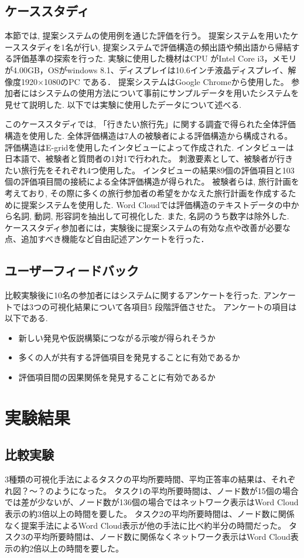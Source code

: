 \documentclass[syuuron]{kuee}
\begin{document}
	\section{ケーススタディ}
		本節では, 提案システムの使用例を通じた評価を行う。
		提案システムを用いたケーススタディを1名が行い, 提案システムで評価構造の頻出語や頻出語から帰結する評価基準の探索を行った. 
		実験に使用した機材はCPU がIntel Core i3，メモリが4.00GB，OSがwindows 8.1、ディスプレイは10.6インチ液晶ディスプレイ、解像度1920×1080のPC である．
		提案システムはGoogle Chromeから使用した。
		参加者にはシステムの使用方法について事前にサンプルデータを用いたシステムを見せて説明した. 以下では実験に使用したデータについて述べる. 
		
		このケーススタディでは, 「行きたい旅行先」に関する調査で得られた全体評価構造を使用した. 
		全体評価構造は7人の被験者による評価構造から構成される。
		評価構造はE-gridを使用したインタビューによって作成された. 
		インタビューは日本語で、被験者と質問者の1対1で行われた。
		刺激要素として、被験者が行きたい旅行先をそれぞれ4つ使用した。
		インタビューの結果89個の評価項目と103個の評価項目間の接続による全体評価構造が得られた。
		被験者らは, 旅行計画を考えており, その際に多くの旅行参加者の希望をかなえた旅行計画を作成するために提案システムを使用した. 
		Word Cloudでは評価構造のテキストデータの中から名詞, 動詞, 形容詞を抽出して可視化した. 
		また, 名詞のうち数字は除外した. 
		ケーススタディ参加者には，実験後に提案システムの有効な点や改善が必要な点、追加すべき機能など自由記述アンケートを行った．
		
	\section{ユーザーフィードバック}
		比較実験後に10名の参加者にはシステムに関するアンケートを行った. 
		アンケートでは3つの可視化結果について各項目5 段階評価させた。
		アンケートの項目は以下である. 
		\begin{itemize}
			\item 新しい発見や仮説構築につながる示唆が得られそうか
			\item 多くの人が共有する評価項目を発見することに有効であるか
			\item 評価項目間の因果関係を発見することに有効であるか
		\end{itemize}

\chapter{実験結果}
	\section{比較実験}
	3種類の可視化手法によるタスクの平均所要時間、平均正答率の結果は、それぞれ図？～？のようになった。
	タスク1の平均所要時間は、ノード数が15個の場合では差が少ないが、ノード数が136個の場合ではネットワーク表示はWord Cloud表示の約3倍以上の時間を要した。
	タスク2の平均所要時間は、ノード数に関係なく提案手法によるWord Cloud表示が他の手法に比べ約半分の時間だった。
	タスク3の平均所要時間は、ノード数に関係なくネットワーク表示はWord Cloud表示の約2倍以上の時間を要した。
	
\end{document}
